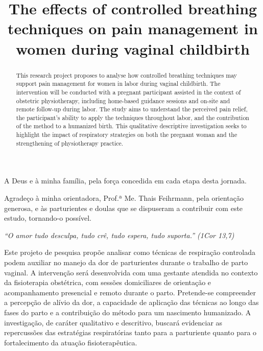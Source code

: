\documentclass[openright]{normas-utf-tex}
\title{The effects of controlled breathing techniques on pain management in women during vaginal childbirth}
\begin{document}
\pdfstringdefDisableCommands{%
        \let\MakeUppercase\relax
}
\capa
\folhaderosto

\begin{dedicatoria}
\vspace*{\fill}
A Deus e à minha família, pela força concedida em cada etapa desta jornada.\\[1ex]
\vspace*{\fill}
\end{dedicatoria}

\begin{agradecimentos}
Agradeço à minha orientadora, Prof.ª Me. Thais Feihrmann, pela orientação generosa, e às parturientes e doulas que se dispuseram a contribuir com este estudo, tornando-o possível.
\end{agradecimentos}

\begin{epigrafe}
\begin{flushright}
\emph{``O amor tudo desculpa, tudo crê, tudo espera, tudo suporta.'' (1Cor 13,7)}
\end{flushright}
\end{epigrafe}

\begin{resumo}
Este projeto de pesquisa propõe analisar como técnicas de respiração controlada podem auxiliar no manejo da dor de parturientes durante o trabalho de parto vaginal. A intervenção será desenvolvida com uma gestante atendida no contexto da fisioterapia obstétrica, com sessões domiciliares de orientação e acompanhamento presencial e remoto durante o parto. Pretende-se compreender a percepção de alívio da dor, a capacidade de aplicação das técnicas ao longo das fases do parto e a contribuição do método para um nascimento humanizado. A investigação, de caráter qualitativo e descritivo, buscará evidenciar as repercussões das estratégias respiratórias tanto para a parturiente quanto para o fortalecimento da atuação fisioterapêutica.
\end{resumo}

\begin{abstract}
This research project proposes to analyse how controlled breathing techniques may support pain management for women in labor during vaginal childbirth. The intervention will be conducted with a pregnant participant assisted in the context of obstetric physiotherapy, including home-based guidance sessions and on-site and remote follow-up during labor. The study aims to understand the perceived pain relief, the participant's ability to apply the techniques throughout labor, and the contribution of the method to a humanized birth. This qualitative descriptive investigation seeks to highlight the impact of respiratory strategies on both the pregnant woman and the strengthening of physiotherapy practice.
\end{abstract}
\end{document}
